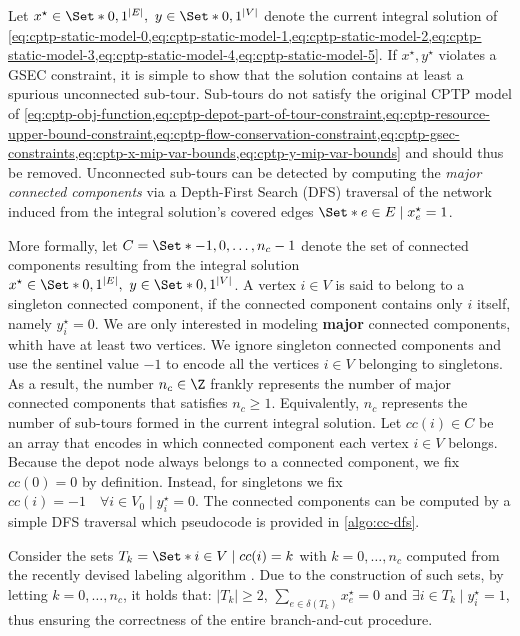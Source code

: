 Let $x^\star \in \Set*{0, 1}^{|E|},\ y \in \Set*{0, 1}^{|V|}$ denote the
current integral solution of
\cref{eq:cptp-static-model-0,eq:cptp-static-model-1,eq:cptp-static-model-2,eq:cptp-static-model-3,eq:cptp-static-model-4,eq:cptp-static-model-5}.
If $x^\star, y^\star$ violates a GSEC constraint,
it is simple to show that the solution contains at least a spurious unconnected sub-tour.
Sub-tours do not satisfy the original CPTP model of
\cref{eq:cptp-obj-function,eq:cptp-depot-part-of-tour-constraint,eq:cptp-resource-upper-bound-constraint,eq:cptp-flow-conservation-constraint,eq:cptp-gsec-constraints,eq:cptp-x-mip-var-bounds,eq:cptp-y-mip-var-bounds}
and should thus be removed.
Unconnected sub-tours can be detected
by computing the \textit{major connected components}
via a Depth-First Search (DFS) traversal
of the network induced from the integral solution's covered edges $\Set*{e \in E \mid x^\star_e = 1}$.

\medskip

More formally,
let $C = \Set*{-1, 0, \dots, n_c - 1}$ denote the set of connected components
resulting from the integral solution $x^\star \in \Set*{0, 1}^{|E|},\ y \in \Set*{0, 1}^{|V|}$.
A vertex $i \in V$ is said to belong to a singleton connected component,
if the connected component contains only $i$ itself, namely $y^\star_i = 0$.
We are only interested in modeling \textbf{major} connected components,
whith have at least two vertices.
We ignore singleton connected components
and use the sentinel value $-1$ to encode all the vertices $i \in V$ belonging to singletons.
As a result, the number $n_c \in \Z$ frankly represents the number
of major connected components that satisfies $n_c \ge 1$.
Equivalently,
$n_c$ represents the number of sub-tours formed in the current integral solution.
Let $cc(i) \in C$ be an array
that encodes in which connected component each vertex $i \in V$ belongs.
Because the depot node always belongs to a connected component, we fix $cc(0) = 0$ by definition.
Instead, for singletons we fix $cc(i) = -1  \quad \forall i \in V_0 \mid y^\star_i = 0$.
The connected components can be computed
by a simple DFS traversal which pseudocode is provided in \cref{algo:cc-dfs}.

Consider the sets $T_k = \Set*{i \in V \mid cc(i) = k}$ with $k = 0, \dots, n_c$
computed from the recently devised labeling algorithm .
Due to the construction of such sets,
by letting $k = 0, \dots, n_c$,
it holds that:
$|T_k| \ge 2$,
$\sum_{e \in \delta(T_k)} x^\star_e = 0$
and $\exists i \in T_k \mid y^\star_i = 1$,
thus ensuring the correctness of the entire branch-and-cut procedure.

